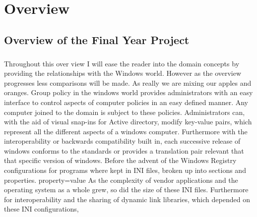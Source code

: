 \chapter{Overview}
\setcounter{page}{1}
	\section{Overview of the Final Year Project}
	    \begin{multicols}{2}
		\paragraph{}
			\vspace{5mm}
			Throughout this over view I will ease the reader into the domain concepts by providing the relationships with the Windows world.
			However as the overview progresses less comparisons will be made.  As really we are mixing our apples and oranges.  
			\newline
			\newline
			Group policy in the windows world provides administrators with an easy interface to control aspects of computer policies in an 
			easy defined manner.  Any computer joined to the domain is subject to these policies.  Administrators can, with the aid of visual
			snap-ins for Active directory, modify key-value pairs, which represent all the different aspects of a windows computer.  
			Furthermore with the interoperability or backwards compatibility built in, each successive release of windows conforms to 
			the standards or provides a translation pair relevant that that specific version of windows. 
			\newline
			\newline
			Before the advent of the Windows Registry configurations for programs where kept in INI files, broken up into sections and properties.
			\newline
			\newline
			[section]
			\newline
			property=value
			\newline
			\newline
			As the complexity of vendor applications and the operating system as a whole grew, so did the size of these INI files.  
			Furthermore for interoperability and the sharing of dynamic link libraries, which depended on these INI configurations, 

\end{multicols}
